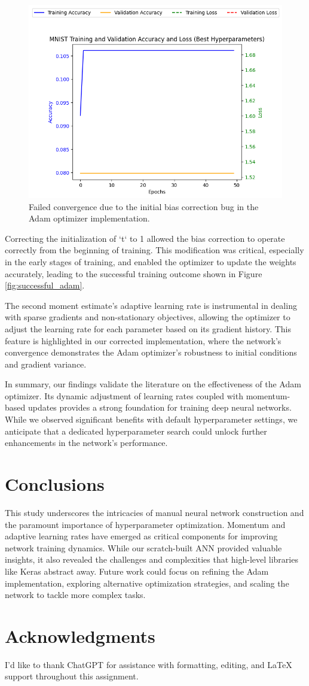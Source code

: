 \documentclass[letterpaper]{article}
\begin{document}
\begin{figure}[ht]
    \centering
    \includegraphics[width=0.8\linewidth]{failed_adam.png}
    \caption{Failed convergence due to the initial bias correction bug in the Adam optimizer implementation.}
    \label{fig:failed_adam}
\end{figure}

Correcting the initialization of `t` to 1 allowed the bias correction to operate correctly from the beginning of training. This modification was critical, especially in the early stages of training, and enabled the optimizer to update the weights accurately, leading to the successful training outcome shown in Figure \ref{fig:successful_adam}.

The second moment estimate's adaptive learning rate is instrumental in dealing with sparse gradients and non-stationary objectives, allowing the optimizer to adjust the learning rate for each parameter based on its gradient history. This feature is highlighted in our corrected implementation, where the network's convergence demonstrates the Adam optimizer's robustness to initial conditions and gradient variance.

In summary, our findings validate the literature on the effectiveness of the Adam optimizer. Its dynamic adjustment of learning rates coupled with momentum-based updates provides a strong foundation for training deep neural networks. While we observed significant benefits with default hyperparameter settings, we anticipate that a dedicated hyperparameter search could unlock further enhancements in the network's performance.


\section{Conclusions}
\label{sec:conclusions}
This study underscores the intricacies of manual neural network construction and the paramount importance of hyperparameter optimization. Momentum and adaptive learning rates have emerged as critical components for improving network training dynamics. While our scratch-built ANN provided valuable insights, it also revealed the challenges and complexities that high-level libraries like Keras abstract away. Future work could focus on refining the Adam implementation, exploring alternative optimization strategies, and scaling the network to tackle more complex tasks.

\section*{Acknowledgments}
I'd like to thank ChatGPT \cite{ChatGPT2023} for assistance with formatting, editing, and LaTeX support throughout this assignment.


\end{document}
